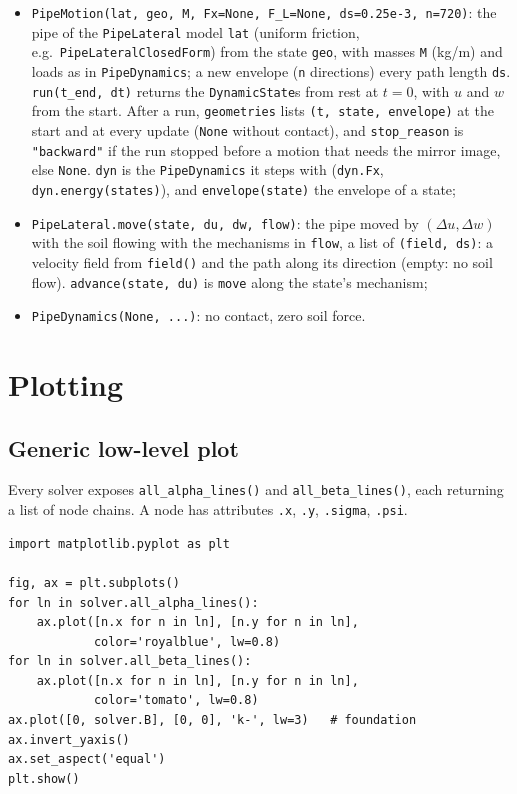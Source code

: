 \documentclass[11pt,a4paper]{article}
\begin{document}
\begin{itemize}
  \item \texttt{PipeMotion(lat, geo, M, Fx=None, F\_L=None, ds=0.25e-3,
    n=720)}: the pipe of the \texttt{PipeLateral} model \texttt{lat}
    (uniform friction, e.g.\ \texttt{PipeLateralClosedForm}) from the
    state \texttt{geo}, with masses \texttt{M} (kg/m) and loads as in
    \texttt{PipeDynamics}; a new envelope (\texttt{n} directions) every
    path length \texttt{ds}.  \texttt{run(t\_end, dt)} returns the
    \texttt{DynamicState}s from rest at $t = 0$, with $u$ and $w$ from
    the start.  After a run, \texttt{geometries} lists
    \texttt{(t, state, envelope)} at the start and at every update
    (\texttt{None} without contact), and \texttt{stop\_reason} is
    \texttt{"backward"} if the run stopped before a motion that needs
    the mirror image, else \texttt{None}.  \texttt{dyn} is the
    \texttt{PipeDynamics} it steps with (\texttt{dyn.Fx},
    \texttt{dyn.energy(states)}), and \texttt{envelope(state)} the
    envelope of a state;
  \item \texttt{PipeLateral.move(state, du, dw, flow)}: the pipe moved
    by $(\Delta u, \Delta w)$ with the soil flowing with the mechanisms
    in \texttt{flow}, a list of \texttt{(field, ds)}: a velocity field
    from \texttt{field()} and the path along its direction (empty: no
    soil flow).  \texttt{advance(state, du)} is \texttt{move} along the
    state's mechanism;
  \item \texttt{PipeDynamics(None, ...)}: no contact, zero soil force.
\end{itemize}

\section{Plotting}
\label{sec:plot}

\subsection{Generic low-level plot}

Every solver exposes \texttt{all\_alpha\_lines()} and
\texttt{all\_beta\_lines()}, each returning a list of node chains.
A node has attributes \texttt{.x}, \texttt{.y}, \texttt{.sigma},
\texttt{.psi}.

\begin{lstlisting}
import matplotlib.pyplot as plt

fig, ax = plt.subplots()
for ln in solver.all_alpha_lines():
    ax.plot([n.x for n in ln], [n.y for n in ln],
            color='royalblue', lw=0.8)
for ln in solver.all_beta_lines():
    ax.plot([n.x for n in ln], [n.y for n in ln],
            color='tomato', lw=0.8)
ax.plot([0, solver.B], [0, 0], 'k-', lw=3)   # foundation
ax.invert_yaxis()
ax.set_aspect('equal')
plt.show()
\end{lstlisting}
\end{document}
